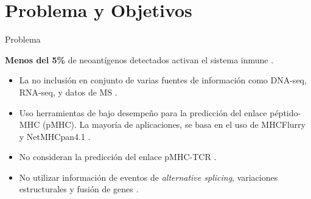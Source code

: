\documentclass[10pt]{beamer}
\newcommand{\1}{
	\setbeamertemplate{background}{
		\texttt{[image: img/1]}
		\tikz[overlay] \fill[fill opacity=0.75,fill=white] (0,0) rectangle (-\paperwidth,\paperheight);
	}
}
\begin{document}
\section{Problema y Objetivos}
\begin{frame}{Problema}{}	
	\begin{block}{}
		\textbf{Menos del 5\%} de neoantígenos detectados activan el sistema inmune \cite{de2020neoantigen, mill2022neoms, bulik2019deep, bassani2015mass, yadav2014predicting}.
	\end{block}
	
	\pause
	\begin{block}{}
		\begin{itemize} 
			\item La no inclusión en conjunto de varias fuentes de información como DNA-seq, RNA-seq, y datos de MS \cite{kim2018neopepsee}. \pause
			\item  Uso herramientas de bajo desempeño para la predicción del enlace péptido-MHC (pMHC). La mayoría de aplicaciones, se basa en el uso de MHCFlurry \cite{o2020mhcflurry} y NetMHCpan4.1 \cite{reynisson2020netmhcpan}. \pause
			\item No consideran  la predicción del enlace pMHC-TCR  \cite{rubinsteyn2018computational}. \pause
			\item No utilizar información de eventos de \textit{alternative splicing}, variaciones estructurales y  fusión de genes \cite{wood2020neoepiscope}.
		\end{itemize}
	\end{block}
	
\end{frame}
\end{document}
